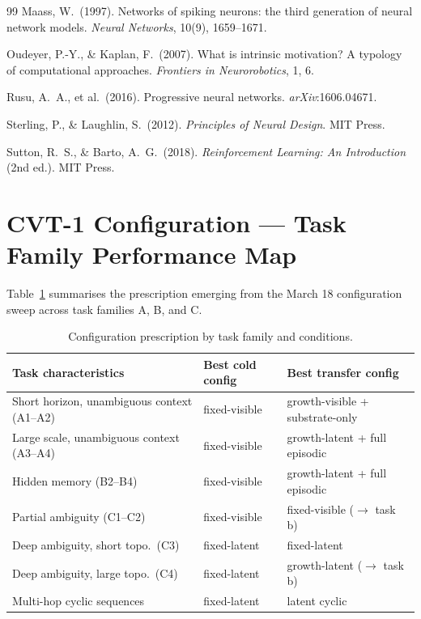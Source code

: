 \documentclass[10pt,twocolumn]{article}
\begin{document}
\begin{thebibliography}{99}
Maass, W.\ (1997).
Networks of spiking neurons: the third generation of neural network models.
\textit{Neural Networks}, 10(9), 1659--1671.

Oudeyer, P.-Y., \& Kaplan, F.\ (2007).
What is intrinsic motivation? A typology of computational approaches.
\textit{Frontiers in Neurorobotics}, 1, 6.

Rusu, A.\ A., et al.\ (2016).
Progressive neural networks.
\textit{arXiv}:1606.04671.

Sterling, P., \& Laughlin, S.\ (2012).
\textit{Principles of Neural Design}.
MIT Press.

Sutton, R.\ S., \& Barto, A.\ G.\ (2018).
\textit{Reinforcement Learning: An Introduction} (2nd ed.).
MIT Press.

\end{thebibliography}

\appendix

\section{CVT-1 Configuration --- Task Family Performance Map}
\label{app:config_map}

Table~\ref{tab:config_map} summarises the prescription emerging from the
March 18 configuration sweep across task families A, B, and C.

\begin{table}[h]
\centering
\caption{Configuration prescription by task family and conditions.}
\label{tab:config_map}
\small
\renewcommand{\arraystretch}{1.15}
\begin{tabular}{p{3.0cm}p{2.0cm}p{2.5cm}}
\toprule
Task characteristics & Best cold config & Best transfer config \\
\midrule
Short horizon, unambiguous context (A1--A2)
  & fixed-visible & growth-visible + substrate-only \\
Large scale, unambiguous context (A3--A4)
  & fixed-visible & growth-latent + full episodic \\
Hidden memory (B2--B4)
  & fixed-visible & growth-latent + full episodic \\
Partial ambiguity (C1--C2)
  & fixed-visible & fixed-visible ($\to$ task b) \\
Deep ambiguity, short topo.\ (C3)
  & fixed-latent & fixed-latent \\
Deep ambiguity, large topo.\ (C4)
  & fixed-latent & growth-latent ($\to$ task b) \\
Multi-hop cyclic sequences
  & fixed-latent & latent cyclic \\
\bottomrule
\end{tabular}
\end{table}
\end{document}
